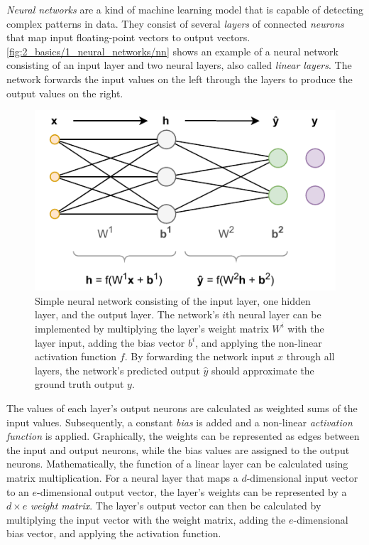 \emph{Neural networks} are a kind of machine learning model that is capable of detecting complex patterns in data. They consist of several \emph{layers} of connected \emph{neurons} that map input floating-point vectors to output vectors. \autoref{fig:2_basics/1_neural_networks/nn} shows an example of a neural network consisting of an input layer and two neural layers, also called \emph{linear layers}. The network forwards the input values on the left through the layers to produce the output values on the right.

\begin{figure}[t]
    \centering
    \includegraphics{2_basics/1_neural_networks/nn}
    \caption{Simple neural network consisting of the input layer, one hidden layer, and the output layer. The network's $i$th neural layer can be implemented by multiplying the layer's weight matrix $W^i$ with the layer input, adding the bias vector $b^i$, and applying the non-linear activation function $f$. By forwarding the network input $x$ through all layers, the network's predicted output $\hat{y}$ should approximate the ground truth output $y$.}
    \label{fig:2_basics/1_neural_networks/nn}
\end{figure}

The values of each layer's output neurons are calculated as weighted sums of the input values. Subsequently, a constant \emph{bias} is added and a non-linear \emph{activation function} is applied. Graphically, the weights can be represented as edges between the input and output neurons, while the bias values are assigned to the output neurons. Mathematically, the function of a linear layer can be calculated using matrix multiplication. For a neural layer that maps a $d$-dimensional input vector to an $e$-dimensional output vector, the layer's weights can be represented by a $d \times e$ \emph{weight matrix}. The layer's output vector can then be calculated by multiplying the input vector with the weight matrix, adding the $e$-dimensional bias vector, and applying the activation function.

